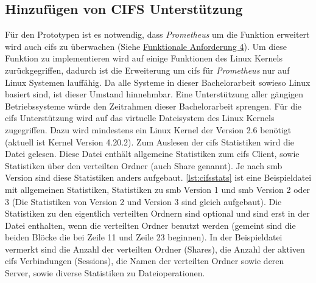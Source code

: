 \documentclass[titlepage]{report}
\begin{document}
\subsection{Hinzufügen von CIFS Unterstützung}
Für den Prototypen ist es notwendig, dass \emph{Prometheus} um die
Funktion erweitert wird auch \gls{cifs} zu überwachen (Siehe
\hyperref[table:mapping1]{Funktionale Anforderung 4}). Um diese Funktion
zu implementieren wird auf einige Funktionen des Linux Kernels
zurückgegriffen, dadurch ist die Erweiterung um \gls{cifs} für
\emph{Prometheus} nur auf Linux Systemen lauffähig. Da alle Systeme in
dieser Bachelorarbeit sowieso Linux basiert sind, ist dieser Umstand
hinnehmbar. Eine Unterstützung aller gängigen Betriebssysteme würde den
Zeitrahmen dieser Bachelorarbeit sprengen. Für die \gls{cifs}
Unterstützung wird auf das virtuelle Dateisystem  des Linux
Kernels zugegriffen. Dazu wird mindestens ein Linux Kernel der Version
2.6 benötigt\cite{CIFSCLIENTGUIDE} (aktuell ist Kernel Version 4.20.2\cite{KERNEL}).
Zum Auslesen der \gls{cifs} Statistiken wird die Datei
 gelesen. Diese Datei enthält allgemeine
Statistiken zum \gls{cifs} Client, sowie Statistiken über den verteilten
Ordner (auch Share genannt). Je nach \gls{smb} Version sind diese
Statistiken anders aufgebaut. \autoref{lst:cifsstats} ist eine Beispieldatei
mit allgemeinen Statistiken, Statistiken zu \gls{smb} Version 1
und \gls{smb} Version 2 oder 3 (Die Statistiken von Version 2 und
Version 3 sind gleich aufgebaut). Die Statistiken zu den eigentlich
verteilten Ordnern sind optional und sind erst in der Datei enthalten,
wenn die verteilten Ordner benutzt werden (gemeint sind die beiden
Blöcke die bei Zeile 11 und Zeile 23 beginnen). In der Beispieldatei
vermerkt sind die Anzahl der verteilten Ordner (Shares), die Anzahl der
aktiven \gls{cifs} Verbindungen (Sessions), die Namen der verteilten
Ordner sowie deren Server,  sowie diverse Statistiken zu
Dateioperationen.
\end{document}
